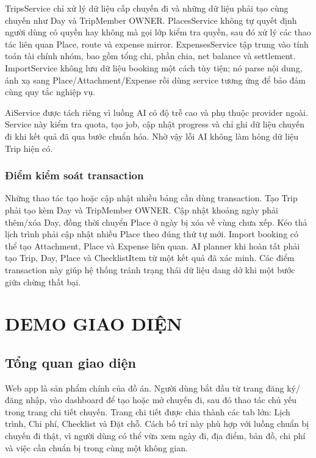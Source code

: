 \documentclass[a4paper]{report}
\begin{document}
TripsService chỉ xử lý dữ liệu cấp chuyến đi và những dữ liệu phải tạo cùng chuyến như Day và TripMember OWNER. PlacesService không tự quyết định người dùng có quyền hay không mà gọi lớp kiểm tra quyền, sau đó xử lý các thao tác liên quan Place, route và expense mirror. ExpensesService tập trung vào tính toán tài chính nhóm, bao gồm tổng chi, phần chia, net balance và settlement. ImportService không lưu dữ liệu booking một cách tùy tiện; nó parse nội dung, ánh xạ sang Place/Attachment/Expense rồi dùng service tương ứng để bảo đảm cùng quy tắc nghiệp vụ.

AiService được tách riêng vì luồng AI có độ trễ cao và phụ thuộc provider ngoài. Service này kiểm tra quota, tạo job, cập nhật progress và chỉ ghi dữ liệu chuyến đi khi kết quả đã qua bước chuẩn hóa. Nhờ vậy lỗi AI không làm hỏng dữ liệu Trip hiện có.

\subsection{Điểm kiểm soát transaction}

Những thao tác tạo hoặc cập nhật nhiều bảng cần dùng transaction. Tạo Trip phải tạo kèm Day và TripMember OWNER. Cập nhật khoảng ngày phải thêm/xóa Day, đồng thời chuyển Place ở ngày bị xóa về vùng chưa xếp. Kéo thả lịch trình phải cập nhật nhiều Place theo đúng thứ tự mới. Import booking có thể tạo Attachment, Place và Expense liên quan. AI planner khi hoàn tất phải tạo Trip, Day, Place và ChecklistItem từ một kết quả đã xác minh. Các điểm transaction này giúp hệ thống tránh trạng thái dữ liệu dang dở khi một bước giữa chừng thất bại.

\chapter{DEMO GIAO DIỆN}

\section{Tổng quan giao diện}

Web app là sản phẩm chính của đồ án. Người dùng bắt đầu từ trang đăng ký/đăng nhập, vào dashboard để tạo hoặc mở chuyến đi, sau đó thao tác chủ yếu trong trang chi tiết chuyến. Trang chi tiết được chia thành các tab lớn: Lịch trình, Chi phí, Checklist và Đặt chỗ. Cách bố trí này phù hợp với luồng chuẩn bị chuyến đi thật, vì người dùng có thể vừa xem ngày đi, địa điểm, bản đồ, chi phí và việc cần chuẩn bị trong cùng một không gian.
\end{document}
